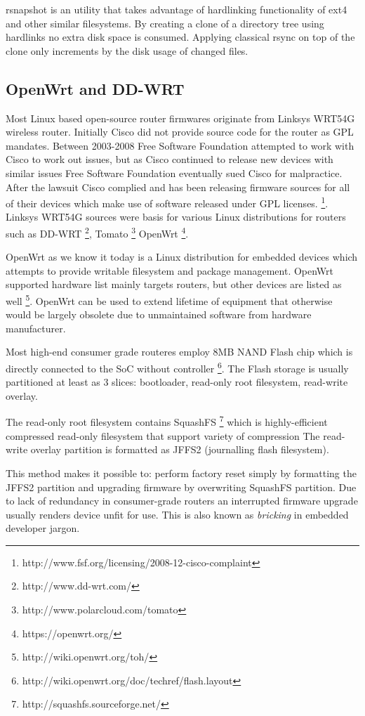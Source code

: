 \documentclass{article}
\begin{document}
rsnapshot is an utility that takes advantage of hardlinking functionality of ext4 and other similar filesystems. By creating a clone of a directory tree using hardlinks no extra disk space is consumed. Applying classical rsync on top of the clone only increments by the disk usage of changed files.


\subsection{OpenWrt and DD-WRT}

Most Linux based open-source router firmwares originate from Linksys WRT54G
wireless router.
Initially Cisco did not provide source code for the router as GPL mandates.
Between 2003-2008 Free Software Foundation attempted to work with Cisco
to work out issues, but as Cisco continued to release new devices with similar
issues Free Software Foundation eventually sued Cisco for malpractice.
After the lawsuit Cisco complied and has been releasing firmware sources for
all of their devices which make use of software released under GPL licenses.
\footnote{http://www.fsf.org/licensing/2008-12-cisco-complaint}.
Linksys WRT54G sources were basis for various Linux distributions for routers such as
DD-WRT \footnote{http://www.dd-wrt.com/},
Tomato \footnote{http://www.polarcloud.com/tomato}
OpenWrt \footnote{https://openwrt.org/}.

OpenWrt as we know it today is a Linux distribution for embedded devices
which attempts to provide writable filesystem and package management.
OpenWrt supported hardware list mainly targets routers, but other devices are
listed as well \footnote{http://wiki.openwrt.org/toh/}. OpenWrt can be used to
extend lifetime of equipment that otherwise would be largely obsolete due
to unmaintained software from hardware manufacturer.

Most high-end consumer grade routeres employ 8MB NAND Flash chip which is
directly connected to the SoC without controller
\footnote{http://wiki.openwrt.org/doc/techref/flash.layout}.
The Flash storage is usually partitioned at least as 3 slices:
bootloader, read-only root filesystem, read-write overlay.

The read-only root filesystem contains SquashFS
\footnote{http://squashfs.sourceforge.net/}
which is highly-efficient compressed read-only filesystem that support variety
of compression The read-write overlay partition is formatted as JFFS2
(journalling flash filesystem).

This method makes it possible to: perform factory reset simply by formatting
the JFFS2 partition and upgrading firmware by overwriting SquashFS partition.
Due to lack of redundancy in consumer-grade routers an interrupted firmware
upgrade usually renders device unfit for use. This is also known as
\emph{bricking} in embedded developer jargon.
\end{document}
